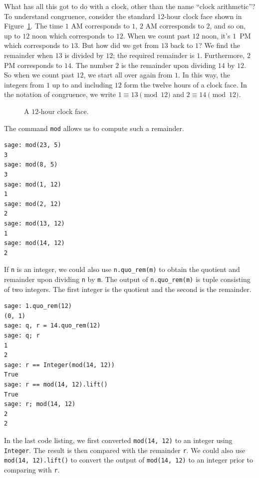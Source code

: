 What has all this got to do with a clock, other than the name
``clock arithmetic''? To understand congruence, consider the standard
$12$-hour clock face shown in
Figure~\ref{fig:number_theory:12_hour_clock_face}. The time $1$ AM
corresponds to $1$, $2$ AM corresponds to $2$, and so on, up to $12$
noon which corresponds to $12$. When we count past $12$ noon, it's
$1$~PM which corresponds to $13$. But how did we get from $13$ back to
$1$? We find the remainder when $13$ is divided by $12$; the required
remainder is $1$. Furthermore, $2$ PM corresponds to $14$. The number
$2$ is the remainder upon dividing $14$ by $12$. So when we count past
$12$, we start all over again from $1$. In this way, the integers from
$1$ up to and including $12$ form the twelve hours of a clock face. In
the notation of congruence, we write $1 \equiv 13 \pmod{12}$ and
$2 \equiv 14 \pmod{12}$.

\begin{figure}[!htbp]
\centering
{}
\caption{A $12$-hour clock face.}
\label{fig:number_theory:12_hour_clock_face}
\end{figure}

The command \verb!mod!\index{$\bmod$} allows us to compute such a
remainder.

\begin{lstlisting}
sage: mod(23, 5)
3
sage: mod(8, 5)
3
sage: mod(1, 12)
1
sage: mod(2, 12)
2
sage: mod(13, 12)
1
sage: mod(14, 12)
2
\end{lstlisting}

If \verb!n! is an integer, we could also use \verb!n.quo_rem(m)! to
obtain the quotient and remainder
upon dividing \verb!n! by \verb!m!. The output of \verb!n.quo_rem(m)!
is tuple consisting of two integers. The first integer is the quotient
and the second is the remainder.
%
\begin{lstlisting}
sage: 1.quo_rem(12)
(0, 1)
sage: q, r = 14.quo_rem(12)
sage: q; r
1
2
sage: r == Integer(mod(14, 12))
True
sage: r == mod(14, 12).lift()
True
sage: r; mod(14, 12)
2
2
\end{lstlisting}
%
In the last code listing, we first converted \verb!mod(14, 12)! to an
integer using \verb!Integer!. The result is then compared with the
remainder \verb!r!. We could also use \verb!mod(14, 12).lift()! to
convert the output of \verb!mod(14, 12)! to an integer prior to
comparing with \verb!r!.


